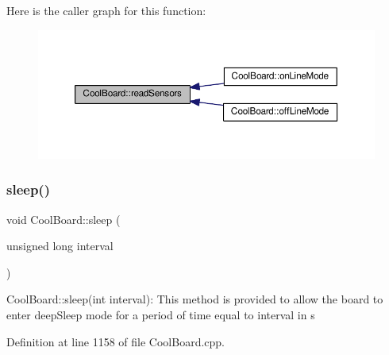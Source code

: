 Here is the caller graph for this function\+:\nopagebreak
\begin{figure}[H]
\begin{center}
\leavevmode
\includegraphics[width=350pt]{d7/df9/class_cool_board_ad03abdce2e65f520bbf2cff0f2d083cf_icgraph}
\end{center}
\end{figure}
\mbox{\label{class_cool_board_a069952cdcb2e7f68518aa429eceadb6e}} 
\subsubsection{\texorpdfstring{sleep()}{sleep()}}
{\footnotesize\ttfamily void Cool\+Board\+::sleep (\begin{DoxyParamCaption}\item[{unsigned long}]{interval }\end{DoxyParamCaption})}

Cool\+Board\+::sleep(int interval)\+: This method is provided to allow the board to enter deep\+Sleep mode for a period of time equal to interval in s 

Definition at line 1158 of file Cool\+Board.\+cpp.


